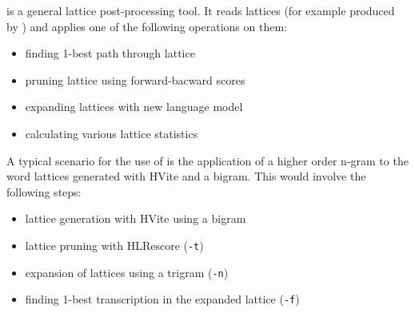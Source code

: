 %
%

\newpage
{}


 is a general lattice post-processing tool. It reads
lattices (for example produced by ) and applies one of
the following operations on them:

\begin{itemize}
\item finding 1-best path through lattice
\item pruning lattice using forward-bacward scores
\item expanding lattices with new language model
\item calculating various lattice statistics
\end{itemize}

A typical scenario for the use of  is the application
of a higher order n-gram to the word lattices generated with HVite and
a bigram. This would involve the following steps:

\begin{itemize}
\item lattice generation with HVite using a bigram
\item lattice pruning with HLRescore (\texttt{-t})
\item expansion of lattices using a trigram (\texttt{-n})
\item finding 1-best transcription in the expanded lattice
  (\texttt{-f})
\end{itemize}

